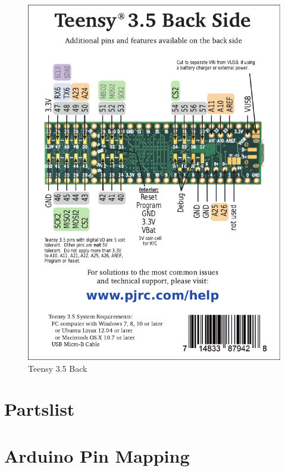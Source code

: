 \documentclass{article}
\begin{document}
\begin{figure}[H]
    \centering
    \includegraphics[width=\textwidth]{images/card8b_rev2.pdf}
    \caption{Teensy 3.5 Back}
    \label{fig:teensy_back}
\end{figure}


\section{Partslist}
\label{app:partslist}


\newpage
\section{Arduino Pin Mapping}
\label{app:pinmap}


%
%
\end{document}
